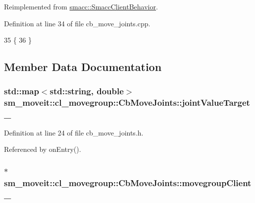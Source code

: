 Reimplemented from \hyperlink{classsmacc_1_1SmaccClientBehavior_ac0cd72d42bd00425362a97c9803ecce5}{smacc\+::\+Smacc\+Client\+Behavior}.



Definition at line 34 of file cb\+\_\+move\+\_\+joints.\+cpp.


\begin{DoxyCode}
35 \{
36 \}
\end{DoxyCode}


\subsection{Member Data Documentation}
\subsubsection[{\texorpdfstring{joint\+Value\+Target\+\_\+}{jointValueTarget_}}]{\setlength{\rightskip}{0pt plus 5cm}std\+::map$<$std\+::string, double$>$ sm\+\_\+moveit\+::cl\+\_\+movegroup\+::\+Cb\+Move\+Joints\+::joint\+Value\+Target\+\_\+}\hypertarget{classsm__moveit_1_1cl__movegroup_1_1CbMoveJoints_a86f4b67097288bcf5ccbe615751705d7}{}\label{classsm__moveit_1_1cl__movegroup_1_1CbMoveJoints_a86f4b67097288bcf5ccbe615751705d7}


Definition at line 24 of file cb\+\_\+move\+\_\+joints.\+h.



Referenced by on\+Entry().

\subsubsection[{\texorpdfstring{movegroup\+Client\+\_\+}{movegroupClient_}}]{$\ast$ sm\+\_\+moveit\+::cl\+\_\+movegroup\+::\+Cb\+Move\+Joints\+::movegroup\+Client\+\_\+\hspace{0.3cm}{\ttfamily [private]}}\hypertarget{classsm__moveit_1_1cl__movegroup_1_1CbMoveJoints_a3994694b9e783bc376e3eabffc214001}{}\label{classsm__moveit_1_1cl__movegroup_1_1CbMoveJoints_a3994694b9e783bc376e3eabffc214001}



